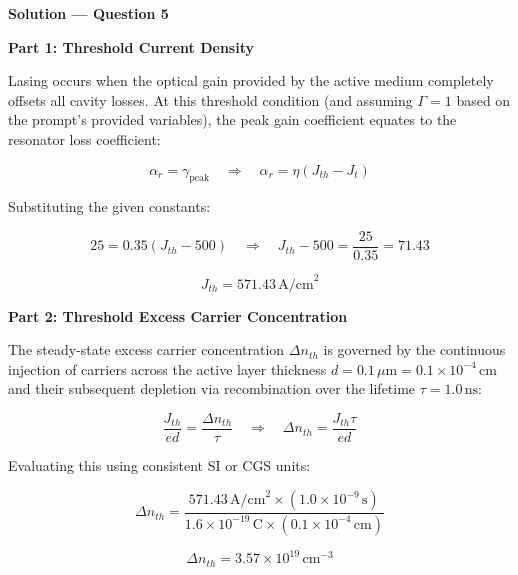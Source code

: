 \textbf{\large Solution --- Question 5}

\textbf{Part 1: Threshold Current Density}

Lasing occurs when the optical gain provided by the active medium completely offsets all cavity losses. At this threshold condition (and assuming $\Gamma = 1$ based on the prompt's provided variables), the peak gain coefficient equates to the resonator loss coefficient:

\begin{equation*}
  \alpha_r = \gamma_{\text{peak}} \quad\Longrightarrow\quad \alpha_r = \eta(J_{th} - J_t)
\end{equation*}

Substituting the given constants:

\begin{equation*}
  25 = 0.35(J_{th} - 500) \quad\Longrightarrow\quad J_{th} - 500 = \frac{25}{0.35} = 71.43
\end{equation*}

\begin{equation*}
  \boxed{J_{th} = 571.43\,\text{A/cm}^2}
\end{equation*}

\textbf{Part 2: Threshold Excess Carrier Concentration}

The steady-state excess carrier concentration $\Delta n_{th}$ is governed by the continuous injection of carriers across the active layer thickness $d = 0.1\,\mu\text{m} = 0.1 \times 10^{-4}\,\text{cm}$ and their subsequent depletion via recombination over the lifetime $\tau = 1.0\,\text{ns}$:

\begin{equation*}
  \frac{J_{th}}{e d} = \frac{\Delta n_{th}}{\tau} \quad\Longrightarrow\quad \Delta n_{th} = \frac{J_{th} \tau}{e d}
\end{equation*}

Evaluating this using consistent SI or CGS units:

\begin{equation*}
  \Delta n_{th} = \frac{571.43\,\text{A/cm}^2 \times (1.0 \times 10^{-9}\,\text{s})}{1.6 \times 10^{-19}\,\text{C} \times (0.1 \times 10^{-4}\,\text{cm})}
\end{equation*}

\begin{equation*}
  \boxed{\Delta n_{th} = 3.57 \times 10^{19}\,\text{cm}^{-3}}
\end{equation*}

